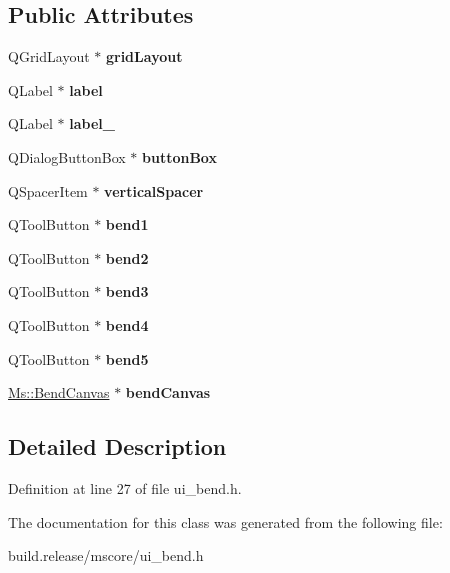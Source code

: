 \subsection*{Public Attributes}
\begin{DoxyCompactItemize}
\item 
\mbox{\label{class_ui___bend_dialog_af94e16b59e5f1f2ca041399ff20dd2f6}} 
Q\+Grid\+Layout $\ast$ {\bfseries grid\+Layout}
\item 
\mbox{\label{class_ui___bend_dialog_af69c73372e4aca1d9c6caa86d0ab3168}} 
Q\+Label $\ast$ {\bfseries label}
\item 
\mbox{\label{class_ui___bend_dialog_ae4692b9abf50a0584fb9c42e9ce7ad66}} 
Q\+Label $\ast$ {\bfseries label\+\_}
\item 
\mbox{\label{class_ui___bend_dialog_aad7a965675bca193e38e9e1cd7fc3dda}} 
Q\+Dialog\+Button\+Box $\ast$ {\bfseries button\+Box}
\item 
\mbox{\label{class_ui___bend_dialog_a51598f404c29cd361de8a9058fae883f}} 
Q\+Spacer\+Item $\ast$ {\bfseries vertical\+Spacer}
\item 
\mbox{\label{class_ui___bend_dialog_ab2a1f84308601e27d1398a60f8418b5d}} 
Q\+Tool\+Button $\ast$ {\bfseries bend1}
\item 
\mbox{\label{class_ui___bend_dialog_a562662202e5b7016935353afb59bda79}} 
Q\+Tool\+Button $\ast$ {\bfseries bend2}
\item 
\mbox{\label{class_ui___bend_dialog_a07d7ffadc9394283b43b63db8fd057b4}} 
Q\+Tool\+Button $\ast$ {\bfseries bend3}
\item 
\mbox{\label{class_ui___bend_dialog_a0f4d5595c21e222f5dc907620a7a83e1}} 
Q\+Tool\+Button $\ast$ {\bfseries bend4}
\item 
\mbox{\label{class_ui___bend_dialog_a25c254a85dcf006d85bd50f9d920da1c}} 
Q\+Tool\+Button $\ast$ {\bfseries bend5}
\item 
\mbox{\label{class_ui___bend_dialog_aa4fcb0a9f07662ed1dc880e89b88b3e4}} 
\hyperlink{class_ms_1_1_bend_canvas}{Ms\+::\+Bend\+Canvas} $\ast$ {\bfseries bend\+Canvas}
\end{DoxyCompactItemize}


\subsection{Detailed Description}


Definition at line 27 of file ui\+\_\+bend.\+h.



The documentation for this class was generated from the following file\+:\begin{DoxyCompactItemize}
\item 
build.\+release/mscore/ui\+\_\+bend.\+h\end{DoxyCompactItemize}
